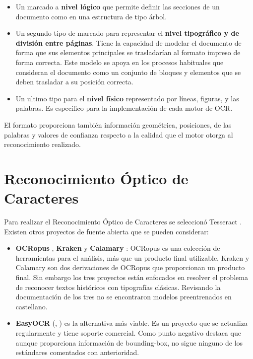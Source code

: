 \begin{itemize}
    \item Un marcado a \textbf{nivel lógico} que permite definir las secciones de un documento como en una estructura de tipo árbol.
    \item Un segundo tipo de marcado para representar el \textbf{nivel tipográfico y de división entre páginas}. Tiene la capacidad de modelar el documento de forma  que sus elementos principales se trasladarían al formato impreso de forma correcta. Este modelo se apoya en los procesos habituales que consideran el documento como un conjunto de bloques y elementos que se deben trasladar a su posición correcta.
    \item Un ultimo tipo para el \textbf{nivel físico} representado por líneas, figuras, y las palabras. Es específico para la implementación de cada motor de OCR. 
\end{itemize}

El formato proporciona también información geométrica, posiciones, de las palabras y valores de confianza respecto a la calidad que el motor otorga al reconocimiento realizado.

\section{Reconocimiento Óptico de Caracteres}
\label{sec:rec-optico-caracteres}

Para realizar el Reconocimiento Óptico de Caracteres se seleccionó Tesseract \cite{ocr_tesseract_raysmithetal.TesseractocrTesseract2021}. Existen otros proyectos de fuente abierta que se pueden considerar:

\begin{itemize}
    \item \textbf{OCRopus} \cite{ocr_ocropus_ocropy_project}, \textbf{Kraken} y \textbf{Calamary} \cite{ocr_calamari_journal}: OCRopus es una colección de herramientas para el análisis, más que un producto final utilizable. Kraken y Calamary son dos derivaciones de OCRopus que proporcionan un producto final. Sin embargo los tres proyectos están enfocados en resolver el problema de reconocer textos históricos con tipografías clásicas. Revisando la documentación de los tres no se encontraron modelos preentrenados en castellano.
    \item \textbf{EasyOCR} (\cite{ocr_easyocr_official}, \cite{ocr_easyocr_project}) es la alternativa más viable. Es un proyecto que se actualiza regularmente y tiene soporte comercial. Como punto negativo destaca que aunque proporciona información de bounding-box, no sigue ninguno de los estándares comentados con anterioridad.
\end{itemize}

